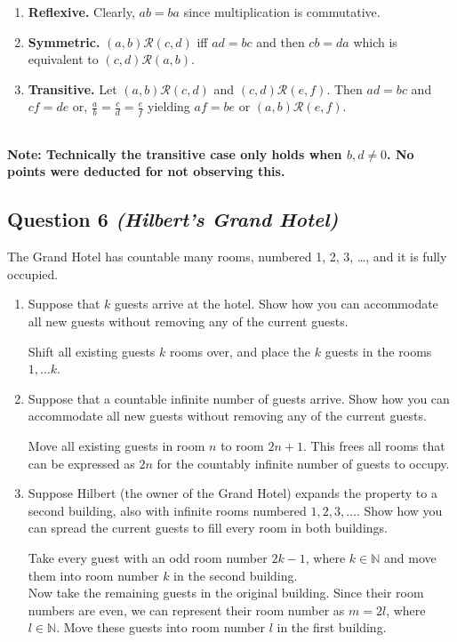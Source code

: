 \documentclass{article}
\begin{document}
\begin{mdframed}
\begin{enumerate}
    \item \textbf{Reflexive.} Clearly, $ab=ba$ since multiplication is commutative.
    \item \textbf{Symmetric.} $(a,b)\mathcal{R} (c,d)$ iff $ad=bc$ and then $cb=da$ which is equivalent to $(c,d)\mathcal{R} (a,b)$.
    \item \textbf{Transitive.} Let $(a,b)\mathcal{R} (c,d)$ and $(c,d)\mathcal{R} (e,f)$. Then $ad=bc$ and $cf=de$ or, $\frac{a}{b}=\frac{c}{d}=\frac{e}{f}$ yielding $af=be$ or  $(a,b)\mathcal{R} (e,f)$.
\end{enumerate} \\

\textbf{Note: Technically the transitive case only holds when $b, d \neq 0$. No points were deducted for not observing this.}
\end{mdframed}



\subsection*{Question 6 \textit{(Hilbert's Grand Hotel)}}
     The Grand Hotel has countable many rooms, numbered 1, 2, 3, \dots, and it is fully occupied.
    \begin{enumerate}
        \item Suppose that $k$ guests arrive at the hotel. Show how you can accommodate all new guests without removing any of the current guests.
    \begin{mdframed}
    Shift all existing guests $k$ rooms over, and place the $k$ guests in the rooms $1, \dots k$.
    \end{mdframed}
        \item Suppose that a countable infinite number of guests arrive. Show how you can accommodate all new guests without removing any of the current guests.
    \begin{mdframed}
    Move all existing guests in room $n$ to room $2n + 1$. This frees all rooms that can be expressed as $2n$ for the countably infinite number of guests to occupy.
    \end{mdframed}
        \item Suppose Hilbert (the owner of the Grand Hotel) expands the property to a second building, also with infinite rooms numbered $1, 2, 3, \dots$. Show how you can spread the current guests to fill every room in both buildings.
    \begin{mdframed}
    Take every guest with an odd room number $2k - 1$, where $k \in \mathbb{N}$ and move them into room number $k$ in the second building. \\
        Now take the remaining guests in the original building. Since their room numbers are even, we can represent their room number as $m = 2l$, where $l \in \mathbb{N}$. Move these guests into room number $l$ in the first building.
    \end{mdframed}
    \end{enumerate}
\end{document}
